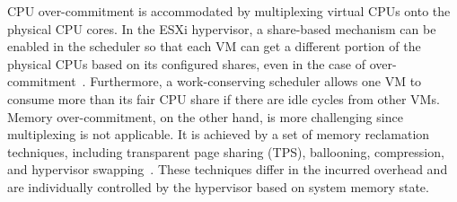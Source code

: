 CPU over-commitment is accommodated by multiplexing virtual 
CPUs onto the physical CPU cores. In the ESXi hypervisor, a share-based mechanism can be enabled  
in the scheduler so that each VM can get a different portion of the physical CPUs based on its configured shares, 
even in the case of over-commitment~\cite{vmware2013scheduler}. Furthermore, a work-conserving scheduler 
allows one VM to consume more than its fair CPU share if there are idle cycles from other VMs. 
Memory over-commitment, on the other hand, is more challenging since multiplexing is not 
applicable. It is achieved by a set of memory reclamation techniques, including transparent page sharing (TPS), 
ballooning, compression, and hypervisor swapping~\cite{Waldspurger:2002:MRM:844128.844146,banerjee2013memory}. These techniques differ in the incurred 
overhead and are individually controlled by the hypervisor based on system memory state.  

